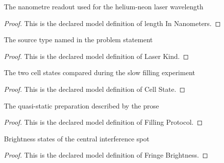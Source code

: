 \begin{definition}
  \label{def:physics:phyx-mini-0250:phyxminiproblems-problemphyxmini0250-lengthinnanometers}
  The nanometre readout used for the helium-neon laser wavelength
\end{definition}
\begin{proof}
  This is the declared model definition of length In Nanometers.
\end{proof}
\begin{definition}
  \label{def:physics:phyx-mini-0250:phyxminiproblems-problemphyxmini0250-laserkind}
  The source type named in the problem statement
\end{definition}
\begin{proof}
  This is the declared model definition of Laser Kind.
\end{proof}
\begin{definition}
  \label{def:physics:phyx-mini-0250:phyxminiproblems-problemphyxmini0250-cellstate}
  The two cell states compared during the slow filling experiment
\end{definition}
\begin{proof}
  This is the declared model definition of Cell State.
\end{proof}
\begin{definition}
  \label{def:physics:phyx-mini-0250:phyxminiproblems-problemphyxmini0250-fillingprotocol}
  The quasi-static preparation described by the prose
\end{definition}
\begin{proof}
  This is the declared model definition of Filling Protocol.
\end{proof}
\begin{definition}
  \label{def:physics:phyx-mini-0250:phyxminiproblems-problemphyxmini0250-fringebrightness}
  Brightness states of the central interference spot
\end{definition}
\begin{proof}
  This is the declared model definition of Fringe Brightness.
\end{proof}
